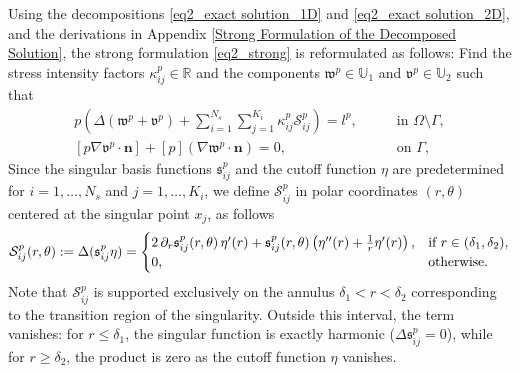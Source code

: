 \documentclass[oneside]{article}
\newcounter{reviewer}
\newcounter{point}[reviewer]
\begin{document}
\noindent 
Using the decompositions \eqref{eq2_exact solution_1D} and \eqref{eq2_exact solution_2D}, and the derivations in Appendix \ref{Strong Formulation of the Decomposed Solution}, the strong formulation \eqref{eq2_strong} is reformulated as follows: 
Find the stress intensity factors $\kappa^p_{ij} \in \mathbb{R}$ and the components $\mathfrak{w}^p \in \mathbb{U}_1$ and $\mathfrak{v}^p \in \mathbb{U}_2$ such that
\begin{align}
   \label{eq2_transmission elliptic problem}p\left(\Delta (\mathfrak{w}^p + \mathfrak{v}^p)+ \sum _{i = 1}^{N_s}\sum _{j = 1}^{K_i}\kappa^p_{ij} \mathcal{S}^p_{ij}\right) = l^p,& \qquad \text{in}\,\, \Omega\setminus\Gamma,\\
\label{eq2_Continuity-flux}
[p \nabla \mathfrak{v}^p \cdot \mathbf{n} ] + [p] (\nabla \mathfrak{w}^p \cdot \mathbf{n}) = 0,
& \qquad \text{on}\,\, \Gamma,
\end{align}
Since the singular basis functions $\mathfrak{s}^p_{ij}$ and the cutoff function $\eta$ are predetermined for $i = 1, \ldots, N_s$ and $j = 1, \ldots, K_i$, we define $\mathcal{S}^{p}_{ij}$ in polar coordinates $(r, \theta)$ centered at the singular point $x_j$, as follows
\begin{equation}\label{eq2_mathcal{S}ij_main}
\mathcal{S}^p_{ij}(r, \theta):= \Delta (\mathfrak{s}^p_{ij} \eta) =
\begin{cases}
2\, \partial_r \mathfrak{s}^p_{ij}(r, \theta)\, \eta'(r) + \mathfrak{s}^p_{ij}(r, \theta)\left( \eta''(r) + \frac{1}{r}\eta'(r) \right), & \text{if } r \in (\delta_1, \delta_2), \\
0, & \text{otherwise}.
\end{cases}
\end{equation}
Note that $\mathcal{S}^p_{ij}$ is supported exclusively on the annulus $\delta_1 < r < \delta_2$ corresponding to the transition region of the singularity. Outside this interval, the term vanishes: for $r \le \delta_1$, the singular function is exactly harmonic ($\Delta \mathfrak{s}^p_{ij} = 0$), while for $r \ge \delta_2$, the product is zero as the cutoff function $\eta$ vanishes.
\end{document}

